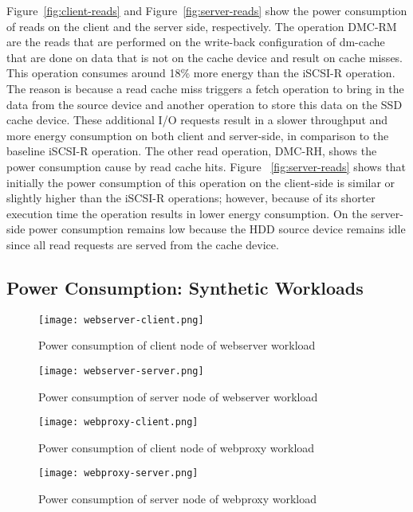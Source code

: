 Figure~\ref{fig:client-reads} and Figure~\ref{fig:server-reads} show the power
consumption of reads on the client and the server side, respectively. The
operation DMC-RM are the reads that are performed on the write-back
configuration of dm-cache that are done on data that is not on the cache device
and result on cache misses. This operation consumes around 18\% more energy than
the iSCSI-R operation. The reason is because a read cache miss triggers a fetch
operation to bring in the data from the source device and another operation to
store this data on the SSD cache device. These additional I/O requests result in
a slower throughput and more energy consumption on both client and server-side,
in comparison to the baseline iSCSI-R operation.  The other read operation,
DMC-RH, shows the power consumption cause by read cache hits. Figure
~\ref{fig:server-reads} shows that initially the power consumption of this
operation on the client-side is similar or slightly higher than the iSCSI-R
operations; however, because of its shorter execution time the operation results
in lower energy consumption. On the server-side power consumption remains low
because the HDD source device remains idle since all read requests are served
from the cache device.

\subsection{Power Consumption: Synthetic Workloads}

\begin{figure}[t]
  \centering \texttt{[image: webserver-client.png]}
  \caption{Power consumption of client node of webserver workload}
  \label{fig:webserver-client}
\end{figure}

\begin{figure}[t]
  \centering \texttt{[image: webserver-server.png]}
  \caption{Power consumption of server node of webserver workload}
  \label{fig:webserver-server}
\end{figure}

\begin{figure}[t]
  \centering \texttt{[image: webproxy-client.png]}
  \caption{Power consumption of client node of webproxy workload}
  \label{fig:webproxy-client}
\end{figure}

\begin{figure}[t]
  \centering \texttt{[image: webproxy-server.png]}
  \caption{Power consumption of server node of webproxy workload}
  \label{fig:webproxy-server}
\end{figure}

